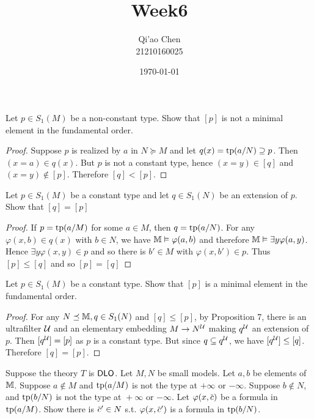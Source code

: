 \documentclass[11pt]{article}
\author{Qi'ao Chen\\21210160025}
\date{\today}
\title{Week6}
\begin{document}
\maketitle
\begin{exercise}
Let \(p\in S_1(M)\) be a non-constant type. Show that \([p]\) is not a minimal element in the
fundamental order.
\end{exercise}

\begin{proof}
Suppose \(p\) is realized by \(a\) in \(N\succeq M\) and let \(q(x)=\operatorname{tp}(a/N)\supseteq p\). Then \((x=a)\in q(x)\).
But \(p\) is not a constant type, hence \((x=y)\in[q]\) and \((x=y)\notin[p]\). Therefore \([q]<[p]\).
\end{proof}

\begin{exercise}
Let \(p\in S_1(M)\) be a constant type and let \(q\in S_1(N)\) be an extension of \(p\). Show that \([q]=[p]\)
\end{exercise}

\begin{proof}
If \(p=\operatorname{tp}(a/M)\) for some \(a\in M\), then \(q=\operatorname{tp}(a/N)\). For any \(\varphi(x,b)\in q(x)\) with \(b\in N\), we
have \(\mathbb{M}\vDash\varphi(a,b)\) and therefore \(\mathbb{M}\vDash\exists y\varphi(a,y)\). Hence \(\exists y\varphi(x,y)\in p\) and so there is \(b'\in M\)
with \(\varphi(x,b')\in p\). Thus \([p]\le[q]\) and so \([p]=[q]\)
\end{proof}

\begin{exercise}
Let \(p\in S_1(M)\) be a constant type. Show that \([p]\) is a minimal element in the fundamental order.
\end{exercise}

\begin{proof}
For any \(N\preceq\mathbb{M}, q\in S_1(N)\) and \([q]\le[p]\), by Proposition 7, there is an ultrafilter \(\mathcal{U}\) and an
elementary embedding \(M\to N^{\mathcal{U}}\) making \(q^{\mathcal{U}}\) an extension of \(p\). Then \([q^{\mathcal{U}}]=[p]\)
as \(p\) is a constant type. But since \(q\subseteq q^{\mathcal{U}}\), we have \([q^{\mathcal{U}}]\le[q]\). Therefore  \([q]=[p]\).
\end{proof}

\begin{exercise}
Suppose the theory \(T\) is \(\operatorname{\textsf{DLO}}\). Let \(M,N\) be small models. Let \(a,b\) be elements of \(\mathbb{M}\).
Suppose \(a\notin M\) and \(\operatorname{tp}(a/M)\) is not the type at \(+\infty\) or \(-\infty\). Suppose \(b\notin N\),
and \(\operatorname{tp}(b/N)\) is not the type at \(​+\infty\) or \(-\infty\). Let \(\varphi(x,\barc)\) be a formula
in \(\operatorname{tp}(a/M)\). Show there is \(\barc'\in N\) s.t. \(\varphi(x,\barc')\) is a formula in \(\operatorname{tp}(b/N)\).
\end{exercise}
\end{document}
